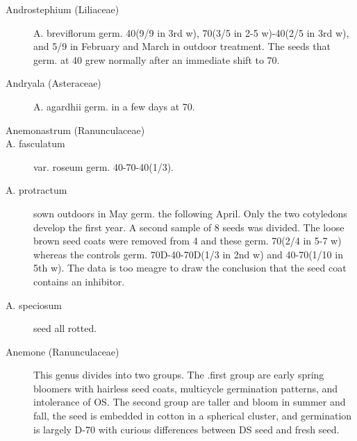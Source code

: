 \begin{description}
\item[Androstephium (Liliaceae)] A. breviflorum germ. 40(9/9 in 3rd w), 70(3/5 in
2-5 w)-40(2/5 in 3rd w), and 5/9 in February and March in outdoor treatment. The
seeds that germ. at 40 grew normally after an immediate shift to 70.

\item[Andryala (Asteraceae)] A. agardhii germ. in a few days at 70.
\item[Anemonastrum (Ranunculaceae)]
\item[A. fasculatum] var. roseum germ. 40-70-40(1/3).
\item[A. protractum] sown outdoors in May germ. the following April. Only the two
cotyledons develop the first year. A second sample of 8 seeds was divided. The loose
brown seed coats were removed from 4 and these germ. 70(2/4 in 5-7 w) whereas the
controls germ. 70D-40-70D(1/3 in 2nd w) and 40-70(1/10 in 5th w). The data is too
meagre to draw the conclusion that the seed coat contains an inhibitor.
\item[A. speciosum] seed all rotted.

\item[Anemone (Ranunculaceae)] This genus divides into two groups. The .first
group are early spring bloomers with hairless seed coats, multicycle germination
patterns, and intolerance of OS. The second group are taller and bloom in summer
and fall, the seed is embedded in cotton in a spherical cluster, and germination is
largely D-70 with curious differences between DS seed and fresh seed.


\end{description}
